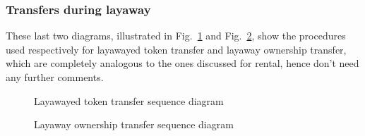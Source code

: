 \documentclass[english, LaM, oneside]{sapthesis}%
\begin{document}
\subsubsection{Transfers during layaway}

These last two diagrams, illustrated in Fig.~\ref{fig:LayawayedTokenTransfer SD} and Fig.~\ref{fig:LayawayOwnershipTransfer SD}, show the procedures used respectively for layawayed token transfer and layaway ownership transfer, which are completely analogous to the ones discussed for rental, hence don't need any further comments.

\begin{figure}[H]
    \centering
        \begin{adjustbox}{width=1\textwidth}
        \end{adjustbox}
    \caption{Layawayed token transfer sequence diagram}
    \label{fig:LayawayedTokenTransfer SD}
\end{figure}

\begin{figure}[H]
    \centering
        \begin{adjustbox}{width=1\textwidth}
        \end{adjustbox}
    \caption{Layaway ownership transfer sequence diagram}
    \label{fig:LayawayOwnershipTransfer SD}
\end{figure}
\end{document}
